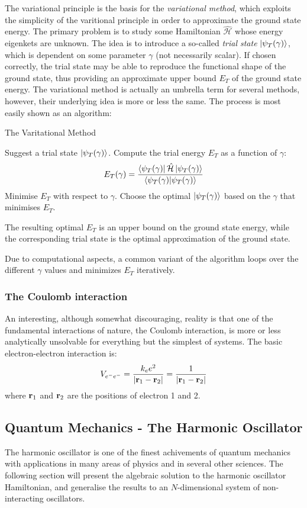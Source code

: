 \documentclass[nofootinbib,reprint,english]{revtex4-1}
\newcommand{\hatHH}{\hat{\mathcal{H}}}
\begin{document}
The variational principle is the basis for the \emph{variational method}, which exploits the simplicity of the varitional principle in order to approximate the ground state energy. The primary problem is to study some Hamiltonian \(\hatHH\) whose energy eigenkets are unknown. The idea is to introduce a so-called \emph{trial state} \(\ket{\psi_T(\gamma)}\), which is dependent on some parameter \(\gamma\) (not necessarily scalar). If chosen correctly, the trial state may be able to reproduce the functional shape of the ground state, thus providing an approximate upper bound \(E_T\) of the ground state energy. The variational method is actually an umbrella term for several methods, however, their underlying idea is more or less the same. The process is most easily shown as an algorithm:
\begin{algorithm}[H]
\caption{The Varitational Method}\label{algo:varitational_method}
\begin{algorithmic}[1]
\State Suggest a trial state \(\ket{\psi_T(\gamma)}\).
\State Compute the trial energy \(E_T\) as a function of \(\gamma\):
\[E_T(\gamma)=\frac{\bra{\psi_T(\gamma)}\hatHH\ket{\psi_T(\gamma)}}{\braket{\psi_T(\gamma)}}\]
\State Minimise \(E_T\) with respect to \(\gamma\).
\State Choose the optimal \(\ket{\psi_T(\gamma)}\) based on the \(\gamma\) that minimises \(E_T\).

\noindent The resulting optimal \(E_T\) is an upper bound on the ground state energy, while the corresponding trial state is the optimal approximation of the ground state.
\end{algorithmic}
\end{algorithm}
Due to computational aspects, a common variant of the algorithm loops over the different \(\gamma\) values and minimizes \(E_T\) iteratively.
\subsubsection{The Coulomb interaction}
An interesting, although somewhat discouraging, reality is that one of the fundamental interactions of nature, the Coulomb interaction, is more or less analytically unsolvable for everything but the simplest of systems. The basic electron-electron interaction is:
\begin{equation}\label{eq:electron_electron_Coulomb_interaction}
V_{e^-e^-}=\frac{k_ee^2}{|\vb{r}_1-\vb{r}_2|}=\frac{1}{|\vb{r}_1-\vb{r}_2|}
\end{equation}
where \(\vb{r}_1\) and \(\vb{r}_2\) are the positions of electron 1 and 2.
\subsection{Quantum Mechanics - The Harmonic Oscillator}
The harmonic oscillator is one of the finest achivements of quantum mechanics with applications in many areas of physics and in several other sciences. The following section will present the algebraic solution to the harmonic oscillator Hamiltonian, and generalise the results to an \(N\)-dimensional system of non-interacting oscillators.
\end{document}
